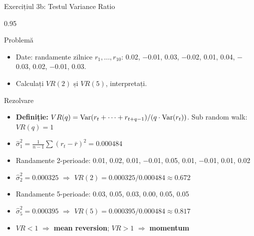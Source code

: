 \documentclass[9pt, aspectratio=169, t]{beamer}
\begin{document}
\begin{frame}{Exercițiul 3b: Testul Variance Ratio}
    \begin{cminipage}{0.95\textwidth}
\begin{block}{Problemă}
\begin{itemize}\setlength{\itemsep}{0pt}
    \item Date: randamente zilnice $r_1, \ldots, r_{10}$: 0.02, $-$0.01, 0.03, $-$0.02, 0.01, 0.04, $-$0.03, 0.02, $-$0.01, 0.03.
    \item Calculați $VR(2)$ și $VR(5)$, interpretați.
\end{itemize}
\end{block}

\begin{exampleblock}{Rezolvare}
\small
\begin{itemize}\setlength{\itemsep}{0pt}
    \item \textbf{Definiție:} $VR(q) = \text{Var}(r_t + \cdots + r_{t+q-1}) / (q \cdot \text{Var}(r_t))$. Sub random walk: $VR(q) = 1$
    \item $\hat\sigma^2_1 = \frac{1}{n-1}\sum(r_t - \bar{r})^2 = 0.000484$
    \item Randamente 2-perioade: 0.01, 0.02, 0.01, $-$0.01, 0.05, 0.01, $-$0.01, 0.01, 0.02
    \item $\hat\sigma^2_2 = 0.000325$ $\Rightarrow$ $VR(2) = 0.000325 / 0.000484 \approx \mathbf{0.672}$
    \item Randamente 5-perioade: 0.03, 0.05, 0.03, 0.00, 0.05, 0.05
    \item $\hat\sigma^2_5 = 0.000395$ $\Rightarrow$ $VR(5) = 0.000395 / 0.000484 \approx \mathbf{0.817}$
    \item $VR < 1$ $\Rightarrow$ \textbf{mean reversion}; $VR > 1$ $\Rightarrow$ \textbf{momentum}
\end{itemize}
\end{exampleblock}

    \end{cminipage}
\end{frame}
\end{document}
